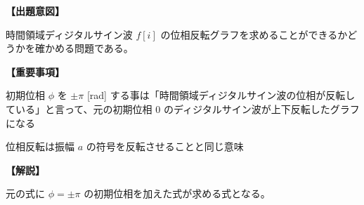 \noindent \textbf{【出題意図】}

\noindent 時間領域ディジタルサイン波 $f[i]$ の位相反転グラフを求めることができるかどうかを確かめる問題である。

\vspace{1em}
\noindent \textbf{【重要事項】}

\bigskip
\noindent  初期位相 $\phi$ を $\pm\pi$ [rad] する事は「時間領域ディジタルサイン波の位相が反転している」と言って、元の初期位相 $0$ のディジタルサイン波が上下反転したグラフになる

\bigskip
\noindent  位相反転は振幅 $a$ の符号を反転させることと同じ意味


\vspace{1em}
\noindent \textbf{【解説】}

\noindent 元の式に $\phi = \pm\pi$ の初期位相を加えた式が求める式となる。
